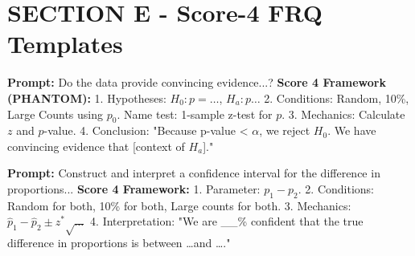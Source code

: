 \section{SECTION E - Score-4 FRQ Templates}
\begin{frqrubricbox}
\textbf{Prompt:} Do the data provide convincing evidence...?
\textbf{Score 4 Framework (PHANTOM):}
1. Hypotheses: $H_0: p = \dots$, $H_a: p \dots$
2. Conditions: Random, 10\%, Large Counts using $p_0$. Name test: 1-sample z-test for $p$.
3. Mechanics: Calculate $z$ and $p$-value.
4. Conclusion: "Because p-value < $\alpha$, we reject $H_0$. We have convincing evidence that [context of $H_a$]."
\end{frqrubricbox}
\begin{frqrubricbox}
\textbf{Prompt:} Construct and interpret a confidence interval for the difference in proportions...
\textbf{Score 4 Framework:}
1. Parameter: $p_1 - p_2$.
2. Conditions: Random for both, 10\% for both, Large counts for both.
3. Mechanics: $\hat{p}_1 - \hat{p}_2 \pm z^* \sqrt{\dots}$
4. Interpretation: "We are \_\_\% confident that the true difference in proportions is between \dots and \dots."
\end{frqrubricbox}

